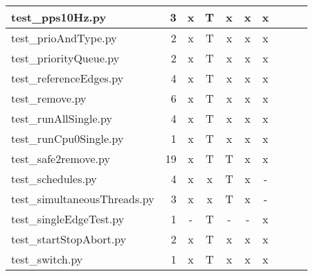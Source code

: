 \documentclass[12pt,a4paper]{report}
\begin{document}
\begin{table}
\begin{tabular}[t]{|l|r|c|c|c|c|c|c|c|c|}
test\_pps10Hz.py                        &  3                  &   x        &   T             &   x           &   x              &   x                 \\ \hline
test\_prioAndType.py                    &  2                  &   x        &   T             &   x           &   x              &   x                 \\ \hline
test\_priorityQueue.py                  &  2                  &   x        &   T             &   x           &   x              &   x                 \\ \hline
test\_referenceEdges.py                 &  4                  &   x        &   T             &   x           &   x              &   x                 \\ \hline
test\_remove.py                         &  6                  &   x        &   T             &   x           &   x              &   x                 \\ \hline
test\_runAllSingle.py                   &  4                  &   x        &   T             &   x           &   x              &   x                 \\ \hline
test\_runCpu0Single.py                  &  1                  &   x        &   T             &   x           &   x              &   x                 \\ \hline
test\_safe2remove.py                    &  19                 &   x        &   T             &   T           &   x              &   x                 \\ \hline
test\_schedules.py                      &  4                  &   x        &   x             &   T           &   x              &   -                 \\ \hline
test\_simultaneousThreads.py            &  3                  &   x        &   x             &   T           &   x              &   -                 \\ \hline
test\_singleEdgeTest.py                 &  1                  &   -        &   T             &   -           &   -              &   x                 \\ \hline
test\_startStopAbort.py                 &  2                  &   x        &   T             &   x           &   x              &   x                 \\ \hline
test\_switch.py                         &  1                  &   x        &   T             &   x           &   x              &   x                 \\ \hline

\end{tabular}
\end{table}
\end{document}
